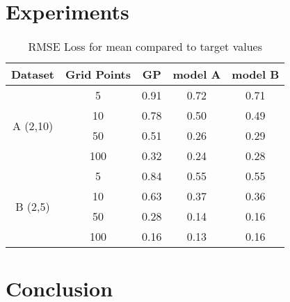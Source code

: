 \section{Experiments}
\label{exp:experiments}

	\begin{figure}
	\centering
	\resizebox{!}{0.40\textheight}{
		
		
	}
	\resizebox{!}{0.40\textheight}{
		
		
	}
\end{figure}

	\begin{figure}
	\centering
	\resizebox{0.95\textwidth}{!}{
		
		
	}
\end{figure}

	\begin{figure}
	\centering
	\resizebox{0.95\textwidth}{!}{
		
		
	}
\end{figure}

	\begin{table}[]
	\caption{RMSE Loss for mean compared to target values}
	\begin{tabular}{c c c c c}
		\toprule
		Dataset & Grid Points & GP & model A & model B\\
		\midrule
		\multirow{4}{*}{A (2,10)} & 5 & 0.91 & 0.72 & 0.71\\
		&10& 0.78 & 0.50 & 0.49\\ 
		&50 & 0.51 & 0.26 & 0.29\\
		&100 & 0.32 & 0.24 & 0.28\\\midrule
		\multirow{4}{*}{B (2,5)} & 5 & 0.84 & 0.55 & 0.55\\
		& 10 & 0.63 & 0.37 & 0.36\\
		& 50 & 0.28 & 0.14 & 0.16\\
		& 100 & 0.16 & 0.13 & 0.16\\\bottomrule
	\end{tabular}
\end{table}

%		
%		
%
%		
%		
%		
%		

\section{Conclusion}
\label{exp:conclusion}
